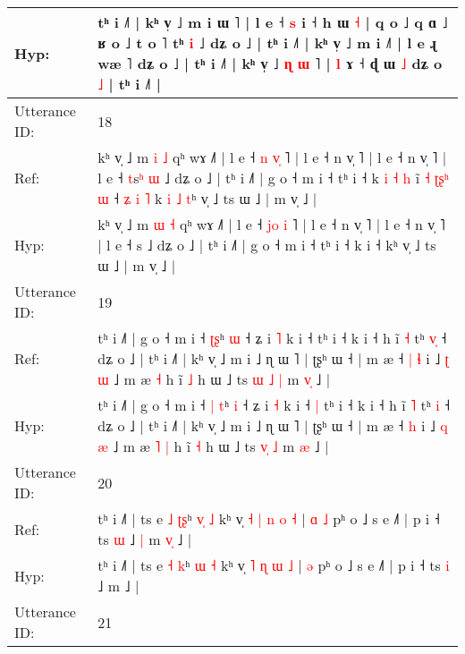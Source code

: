 \documentclass[10pt]{article}
\DeclareRobustCommand{\hl}[1]{{\textcolor{red}{#1}}}
\begin{document}
\begin{longtable}{ll}
Hyp: & tʰ i ˩˥ | kʰ v̩ ˩ m i\hl{}\hl{}\hl{}\hl{} ɯ ˥ | l e ˧ \hl{}\hl{}\hl{s} i ˧ h ɯ \hl{˧} | q o ˩ q ɑ ˩ ʁ o ˩ t o ˥ tʰ \hl{}\hl{i} ˩ dʑ o ˩ | tʰ i ˩˥ | kʰ v̩ ˩ m i ˩˥ | l e\hl{}\hl{} ɻ wæ ˥ dʑ o ˩ | tʰ i ˩˥ | kʰ v̩ ˩ \hl{ɳ} \hl{ɯ} \hl{}˥ | \hl{l} ɤ ˧ ɖ ɯ \hl{˩} dʑ o \hl{˩} | tʰ i ˩˥ |
 \\
\midrule
Utterance ID: & 18 \\
Ref: & kʰ v̩ ˩ m \hl{i} \hl{˩} qʰ wɤ ˩˥ | l e ˧ \hl{n}\hl{ }\hl{v}\hl{̩} ˥ | l e ˧ n v̩ ˥ | l e ˧ n v̩ ˥ | l e ˧ \hl{t}s\hl{ʰ}\hl{ }\hl{ɯ} ˩ dʑ o ˩ | tʰ i ˩˥ | g o ˧ m i ˧ tʰ i ˧ k\hl{ }\hl{i}\hl{ }\hl{˧}\hl{ }\hl{h} i\hl{̃}\hl{ }\hl{˧}\hl{ }\hl{ʈ}\hl{ʂ}\hl{ʰ}\hl{ }\hl{ɯ} ˧\hl{ }\hl{ʑ}\hl{ }\hl{i}\hl{ }\hl{˥} k\hl{ }\hl{i}\hl{ }\hl{˩}\hl{ }\hl{t}ʰ v̩ ˩ ts ɯ ˩ | m v̩ ˩ |
 \\
Hyp: & kʰ v̩ ˩ m \hl{ɯ} \hl{˧} qʰ wɤ ˩˥ | l e ˧ \hl{j}\hl{o}\hl{ }\hl{i} ˥ | l e ˧ n v̩ ˥ | l e ˧ n v̩ ˥ | l e ˧ \hl{}s\hl{}\hl{}\hl{} ˩ dʑ o ˩ | tʰ i ˩˥ | g o ˧ m i ˧ tʰ i ˧ k\hl{}\hl{}\hl{}\hl{}\hl{}\hl{} i\hl{}\hl{}\hl{}\hl{}\hl{}\hl{}\hl{}\hl{}\hl{} ˧\hl{}\hl{}\hl{}\hl{}\hl{}\hl{} k\hl{}\hl{}\hl{}\hl{}\hl{}\hl{}ʰ v̩ ˩ ts ɯ ˩ | m v̩ ˩ |
 \\
\midrule
Utterance ID: & 19 \\
Ref: & tʰ i ˩˥ | g o ˧ m i ˧ \hl{}\hl{ʈ}\hl{ʂ}ʰ \hl{ɯ} ˧ ʑ i \hl{˥} k i ˧\hl{}\hl{} tʰ i ˧ k i ˧ h ĩ \hl{˧} tʰ \hl{v}\hl{̩} ˧ dʑ o ˩ | tʰ i ˩˥ | kʰ v̩ ˩ m i ˩ ɳ ɯ ˥ | ʈʂʰ ɯ ˧ | m æ ˧\hl{ }\hl{|} \hl{ɬ} i ˩ \hl{ʈ} \hl{ɯ} ˩ m æ\hl{}\hl{} \hl{˧} h ĩ \hl{˩} h ɯ ˩ ts \hl{ɯ}\hl{ }\hl{˩} \hl{|} m \hl{v}\hl{̩} ˩ |
 \\
Hyp: & tʰ i ˩˥ | g o ˧ m i ˧ \hl{|}\hl{ }\hl{t}ʰ \hl{i} ˧ ʑ i \hl{˧} k i ˧\hl{ }\hl{|} tʰ i ˧ k i ˧ h ĩ \hl{˥} tʰ \hl{}\hl{i} ˧ dʑ o ˩ | tʰ i ˩˥ | kʰ v̩ ˩ m i ˩ ɳ ɯ ˥ | ʈʂʰ ɯ ˧ | m æ ˧\hl{}\hl{} \hl{h} i ˩ \hl{q} \hl{æ} ˩ m æ\hl{ }\hl{˥} \hl{|} h ĩ \hl{˧} h ɯ ˩ ts \hl{}\hl{v}\hl{̩} \hl{˩} m \hl{}\hl{æ} ˩ |
 \\
\midrule
Utterance ID: & 20 \\
Ref: & tʰ i ˩˥ | ts e \hl{˩} \hl{ʈ}\hl{ʂ}ʰ \hl{v}\hl{̩} \hl{˩} kʰ v̩\hl{ }\hl{˧} \hl{|} \hl{n} \hl{o} \hl{˧} |\hl{ }\hl{ɑ} \hl{˩} pʰ o ˩ s e ˩˥ | p i ˧ ts \hl{ɯ} ˩\hl{ }\hl{|} m\hl{ }\hl{v}\hl{̩} ˩ |
 \\
Hyp: & tʰ i ˩˥ | ts e \hl{˧} \hl{}\hl{k}ʰ \hl{}\hl{ɯ} \hl{˧} kʰ v̩\hl{}\hl{} \hl{˥} \hl{ɳ} \hl{ɯ} \hl{˩} |\hl{}\hl{} \hl{ə} pʰ o ˩ s e ˩˥ | p i ˧ ts \hl{i} ˩\hl{}\hl{} m\hl{}\hl{}\hl{} ˩ |
 \\
\midrule
Utterance ID: & 21 \\

\end{longtable}
\end{document}
